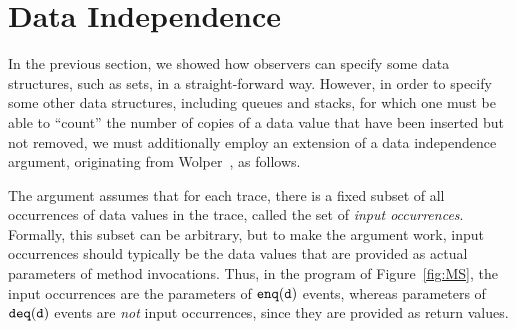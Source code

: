 \section{Data Independence}
\label{sec:wolper}
In the previous section, we showed how observers can 
specify some data structures, such as sets, in a straight-forward way.
However, in order to specify some other
data structures, including queues and stacks, 
for which one must
be able to ``count'' the number of copies of a data value that have been
inserted but not removed, we must additionally employ an extension of a
data independence argument, originating from
Wolper~\cite{Wolper:dataindependence}, as follows.

The argument assumes that for each trace, there is a fixed subset of
all occurrences of data values in the trace, called the set of
{\em input occurrences}.
Formally, this subset can be arbitrary, but to make the argument work,
input occurrences should typically be the data values that are provided as
actual parameters of method invocations.
Thus, in the program of Figure~\ref{fig:MS},
the input occurrences are the parameters of
$\mathtt{enq(d)}$ events, whereas parameters of $\mathtt{deq(d)}$ events are
{\em not} input occurrences, since they are provided as return values.


